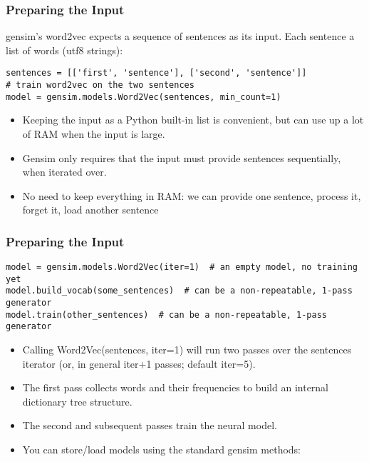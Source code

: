 \begin{frame}[fragile]\frametitle{Preparing the Input}
gensim's word2vec expects a sequence of sentences as its input. Each sentence a list of words (utf8 strings): 
\begin{lstlisting}
sentences = [['first', 'sentence'], ['second', 'sentence']]
# train word2vec on the two sentences
model = gensim.models.Word2Vec(sentences, min_count=1)
\end{lstlisting}
\begin{itemize}
\item Keeping the input as a Python built-in list is convenient, but can use up a lot of RAM when the input is large. 
\item Gensim only requires that the input must provide sentences sequentially, when iterated over. 
\item No need to keep everything in RAM: we can provide one sentence, process it, forget it, load another sentence
\end{itemize}
\end{frame}

\begin{frame}[fragile]\frametitle{Preparing the Input}
\begin{lstlisting}
model = gensim.models.Word2Vec(iter=1)  # an empty model, no training yet
model.build_vocab(some_sentences)  # can be a non-repeatable, 1-pass generator
model.train(other_sentences)  # can be a non-repeatable, 1-pass generator
\end{lstlisting}
\begin{itemize}
\item Calling Word2Vec(sentences, iter=1) will run two passes over the sentences iterator (or, in general iter+1 passes; default iter=5). 
\item The first pass collects words and their frequencies to build an internal dictionary tree structure. 
\item The second and subsequent passes train the neural model. 
\item You can store/load models using the standard gensim methods: 
\end{itemize}
\end{frame}



